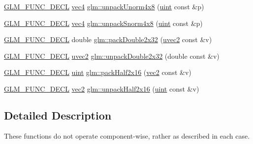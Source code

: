 \begin{DoxyCompactItemize}
\item 
\hyperlink{setup_8hpp_ab2d052de21a70539923e9bcbf6e83a51}{G\+L\+M\+\_\+\+F\+U\+N\+C\+\_\+\+D\+E\+CL} \hyperlink{group__core__types_ga5881b1b022d7fd1b7218f5916532dd02}{vec4} \hyperlink{group__core__func__packing_ga5d3c4d354b48a317935349dd62a8b8a5}{glm\+::unpack\+Unorm4x8} (\hyperlink{group__core__precision_ga4fd29415871152bfb5abd588334147c8}{uint} const \&p)
\item 
\hyperlink{setup_8hpp_ab2d052de21a70539923e9bcbf6e83a51}{G\+L\+M\+\_\+\+F\+U\+N\+C\+\_\+\+D\+E\+CL} \hyperlink{group__core__types_ga5881b1b022d7fd1b7218f5916532dd02}{vec4} \hyperlink{group__core__func__packing_ga126a0deffef1f2d10dd67237981a870b}{glm\+::unpack\+Snorm4x8} (\hyperlink{group__core__precision_ga4fd29415871152bfb5abd588334147c8}{uint} const \&p)
\item 
\hyperlink{setup_8hpp_ab2d052de21a70539923e9bcbf6e83a51}{G\+L\+M\+\_\+\+F\+U\+N\+C\+\_\+\+D\+E\+CL} double \hyperlink{group__core__func__packing_gaf728fdfb98ce34da6f968d9f6bf154d7}{glm\+::pack\+Double2x32} (\hyperlink{group__core__types_gafd2041b45eff671aa8899d2c2835eee9}{uvec2} const \&v)
\item 
\hyperlink{setup_8hpp_ab2d052de21a70539923e9bcbf6e83a51}{G\+L\+M\+\_\+\+F\+U\+N\+C\+\_\+\+D\+E\+CL} \hyperlink{group__core__types_gafd2041b45eff671aa8899d2c2835eee9}{uvec2} \hyperlink{group__core__func__packing_ga7e8cf88c278c18969c99af83bceed024}{glm\+::unpack\+Double2x32} (double const \&v)
\item 
\hyperlink{setup_8hpp_ab2d052de21a70539923e9bcbf6e83a51}{G\+L\+M\+\_\+\+F\+U\+N\+C\+\_\+\+D\+E\+CL} \hyperlink{group__core__precision_ga4fd29415871152bfb5abd588334147c8}{uint} \hyperlink{group__core__func__packing_ga082f6dd65f73a547ed3067ef00be036f}{glm\+::pack\+Half2x16} (\hyperlink{group__core__types_gaa1618f51db67eaa145db101d8c8431d8}{vec2} const \&v)
\item 
\hyperlink{setup_8hpp_ab2d052de21a70539923e9bcbf6e83a51}{G\+L\+M\+\_\+\+F\+U\+N\+C\+\_\+\+D\+E\+CL} \hyperlink{group__core__types_gaa1618f51db67eaa145db101d8c8431d8}{vec2} \hyperlink{group__core__func__packing_ga4051804cc2c930ba4ca73382b79edf1d}{glm\+::unpack\+Half2x16} (\hyperlink{group__core__precision_ga4fd29415871152bfb5abd588334147c8}{uint} const \&v)
\end{DoxyCompactItemize}


\subsection{Detailed Description}
These functions do not operate component-\/wise, rather as described in each case. 


